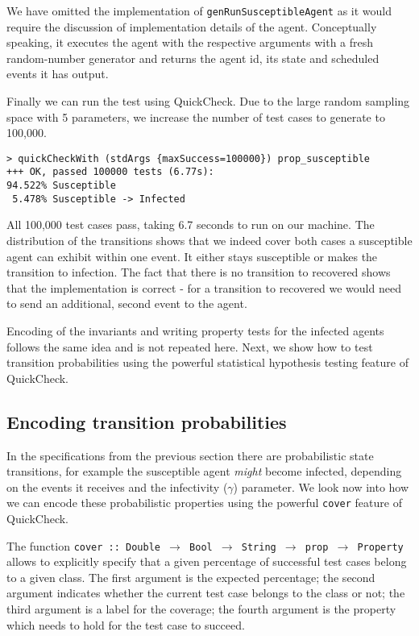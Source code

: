 We have omitted the implementation of \texttt{genRunSusceptibleAgent} as it would require the discussion of implementation details of the agent. Conceptually speaking, it executes the agent with the respective arguments with a fresh random-number generator and returns the agent id, its state and scheduled events it has output.

Finally we can run the test using QuickCheck. Due to the large random sampling space with 5 parameters, we increase the number of test cases to generate to 100,000.

\begin{verbatim}
> quickCheckWith (stdArgs {maxSuccess=100000}) prop_susceptible
+++ OK, passed 100000 tests (6.77s):
94.522% Susceptible
 5.478% Susceptible -> Infected
\end{verbatim}

All 100,000 test cases pass, taking 6.7 seconds to run on our machine. The distribution of the transitions shows that we indeed cover both cases a susceptible agent can exhibit within one event. It either stays susceptible or makes the transition to infection. The fact that there is no transition to recovered shows that the implementation is correct - for a transition to recovered we would need to send an additional, second event to the agent.

Encoding of the invariants and writing property tests for the infected agents follows the same idea and is not repeated here. Next, we show how to test transition probabilities using the powerful statistical hypothesis testing feature of QuickCheck.

\subsection{Encoding transition probabilities}
In the specifications from the previous section there are probabilistic state transitions, for example the susceptible agent \textit{might} become infected, depending on the events it receives and the infectivity ($\gamma$) parameter. We look now into how we can encode these probabilistic properties using the powerful \texttt{cover} feature of QuickCheck.

The function \texttt{cover :: Double $\rightarrow$ Bool $\rightarrow$ String $\rightarrow$ prop $\rightarrow$ Property} allows to explicitly specify that a given percentage of successful test cases belong to a given class. The first argument is the expected percentage; the second argument indicates whether the current test case belongs to the class or not; the third argument is a label for the coverage; the fourth argument is the property which needs to hold for the test case to succeed.

